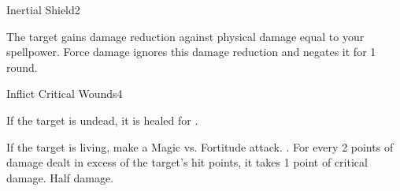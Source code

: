 \begin{spellsection}{Inertial Shield}{2}
    \begin{spellheader}
    \end{spellheader}
    \begin{spellcontent}
        \begin{spelltargetinginfo}
        \end{spelltargetinginfo}
        \begin{spelleffects}
            \spelleffect The target gains damage reduction against physical damage equal to your spellpower. Force damage ignores this damage reduction and negates it for 1 round.
            \spelldur \durshort
        \end{spelleffects}
    \end{spellcontent}
    \begin{spellfooter}
        \miscastexplode
    \end{spellfooter}
\end{spellsection}

\begin{spellsection}{Inflict Critical Wounds}{4}
    \begin{spellheader}
    \end{spellheader}
    \begin{spellcontent}
        \begin{spelltargetinginfo}
        \end{spelltargetinginfo}
        \begin{spelleffects}
            \spelleffect If the target is undead, it is healed for .
            \begin{spellattacktriggered}{If the target is living, make a Magic vs. Fortitude attack.}
                \spellsuccess {}. For every 2 points of damage dealt in excess of the target's hit points, it takes 1 point of critical damage.
                \spellfailure Half damage.
            \end{spellattacktriggered}
        \end{spelleffects}
    \end{spellcontent}
    \begin{spellfooter}
        \miscastrandom
    \end{spellfooter}
\end{spellsection}

